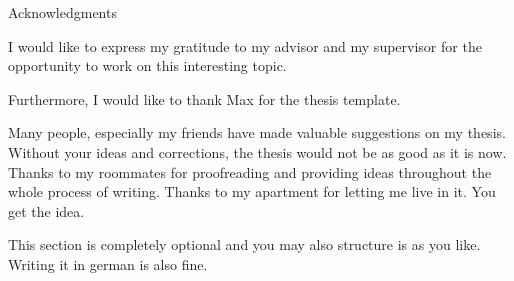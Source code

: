\thispagestyle{empty}

\vspace*{20mm}

\begin{center}
{ Acknowledgments}
\end{center}

\vspace{10mm}

I would like to express my gratitude to my advisor \getAdvisor{} and my supervisor \getSupervisor{} for the opportunity to work on this interesting topic.

Furthermore, I would like to thank Max for the thesis template. 

Many people, especially my friends have made valuable suggestions on my thesis. Without your ideas and corrections, the thesis would not be as good as it is now. Thanks to my roommates for proofreading and providing ideas throughout the whole process of writing. Thanks to my apartment for letting me live in it. You get the idea.

This section is completely optional and you may also structure is as you like. Writing it in german is also fine.


\cleardoublepage{}

